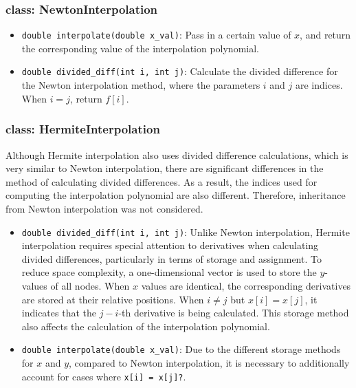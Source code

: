 \documentclass[a4paper]{article}
\begin{document}
\subsubsection*{class: NewtonInterpolation}
\begin{itemize}
    \item \verb|double interpolate(double x_val)|: 
    Pass in a certain value of \( x \), and return the corresponding value of the interpolation polynomial.
    \item \verb|double divided_diff(int i, int j)|: 
    Calculate the divided difference for the Newton interpolation method, where the parameters \( i \) and \( j \) are indices. 
    When \( i = j \), return \( f[i] \).
\end{itemize}
\subsubsection*{class: HermiteInterpolation}

Although Hermite interpolation also uses divided difference calculations, which is very similar to Newton interpolation, there are significant differences in the method of calculating divided differences. 
As a result, the indices used for computing the interpolation polynomial are also different. Therefore, inheritance from Newton interpolation was not considered.

\begin{itemize}
    \item \verb|double divided_diff(int i, int j)|:
    Unlike Newton interpolation, Hermite interpolation requires special attention to derivatives when calculating divided differences, particularly in terms of storage and assignment. 
    To reduce space complexity, a one-dimensional vector is used to store the \( y \)-values of all nodes. 
    When \( x \) values are identical, the corresponding derivatives are stored at their relative positions. 
    When \( i \neq j \) but \( x[i] = x[j] \), it indicates that the \( j-i \)-th derivative is being calculated. 
    This storage method also affects the calculation of the interpolation polynomial.
    \item \verb|double interpolate(double x_val)|:
    Due to the different storage methods for \( x \) and \( y \), compared to Newton interpolation, it is necessary to additionally account for cases where \verb|x[i] = x[j]?|.
    
\end{itemize}
\end{document}
